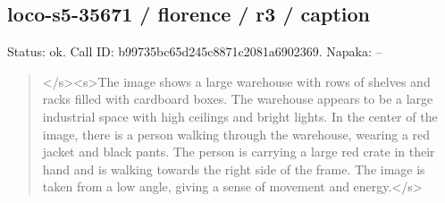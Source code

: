\documentclass[10pt,a4paper]{article}
\begin{document}
\subsection*{loco-s5-35671 / florence / r3 / caption}
Status: ok. Call ID: b99735bc65d245c8871c2081a6902369. Napaka: --
\begin{quote}\footnotesize
</s>\allowbreak{}<s>\allowbreak{}The image shows a large warehouse with rows of shelves and racks filled with cardboard boxes. The warehouse appears to be a large industrial space with high ceilings and bright lights. In the center of the image,\allowbreak{} there is a person walking through the warehouse,\allowbreak{} wearing a red jacket and black pants. The person is carrying a large red crate in their hand and is walking towards the right side of the frame. The image is taken from a low angle,\allowbreak{} giving a sense of movement and energy.</s>\allowbreak{}
\end{quote}
\end{document}
